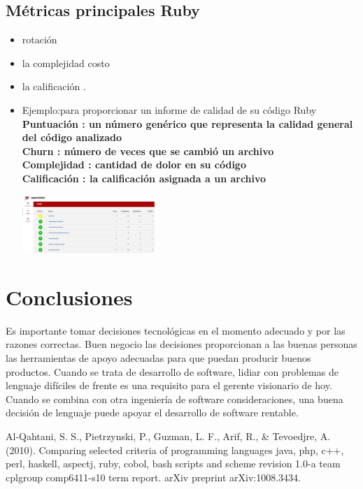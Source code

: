 \documentclass[twoside,twocolumn]{article}
\begin{document}
\subsection {Métricas principales Ruby}
\begin{itemize}
\item rotación 
\item la complejidad 
\itemel costo 
\item la calificación .
\item  Ejemplo:para proporcionar un informe de calidad de su código Ruby
\\ \textbf{ Puntuación : un número genérico que representa la calidad general del código analizado }
\\ \textbf{ Churn : número de veces que se cambió un archivo}
\\ \textbf{ Complejidad : cantidad de dolor en su código}
\\ \textbf{ Calificación : la calificación asignada a un archivo}
\begin{center}
	\includegraphics[width=5cm]{./Imagenes/rating} 
	\end{center}
\end{itemize}

\section{Conclusiones}
Es importante tomar decisiones tecnológicas en el momento adecuado y por las razones correctas. Buen negocio
las decisiones proporcionan a las buenas personas las herramientas de apoyo adecuadas para que puedan producir buenos productos.
Cuando se trata de desarrollo de software, lidiar con problemas de lenguaje difíciles de frente es una
requisito para el gerente visionario de hoy. Cuando se combina con otra ingeniería de software
consideraciones, una buena decisión de lenguaje puede apoyar el desarrollo de software rentable.



\begin{thebibliography}{99} %

 
\newblock Al-Qahtani, S. S., Pietrzynski, P., Guzman, L. F., Arif, R., & Tevoedjre, A. (2010). Comparing selected criteria of programming languages java, php, c++, perl, haskell, aspectj, ruby, cobol, bash scripts and scheme revision 1.0-a team cplgroup comp6411-s10 term report. arXiv preprint arXiv:1008.3434.
\end{thebibliography}

\end{document}
